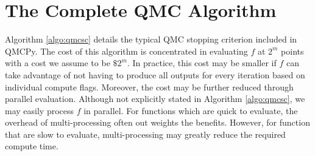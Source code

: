 \documentclass{article}[12pt]
\begin{document}
\section{The Complete QMC Algorithm}

Algorithm \ref{algo:qmcsc} details the typical QMC stopping criterion included in QMCPy. The cost of this algorithm is concentrated in evaluating $f$ at $2^m$ points with a cost we assume to be $\$2^m$. In practice, this cost may be smaller if $f$ can take advantage of not having to produce all outputs for every iteration based on individual compute flags. Moreover, the cost may be further reduced through parallel evaluation. Although not explicitly stated in Algorithm \ref{algo:qmcsc}, we may easily process $f$ in parallel. For functions which are quick to evaluate, the overhead of multi-processing often out weights the benefits. However, for function that are slow to evaluate, multi-processing may greatly reduce the required compute time.
\end{document}
